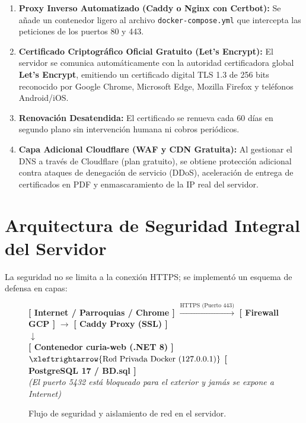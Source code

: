 \documentclass[11pt,a4paper]{article}
\begin{document}
\begin{enumerate}[leftmargin=1.2cm]
    \item \textbf{Proxy Inverso Automatizado (Caddy o Nginx con Certbot):} Se añade un contenedor ligero al archivo \texttt{docker-compose.yml} que intercepta las peticiones de los puertos 80 y 443.
    \item \textbf{Certificado Criptográfico Oficial Gratuito (Let's Encrypt):} El servidor se comunica automáticamente con la autoridad certificadora global \textbf{Let's Encrypt}, emitiendo un certificado digital TLS 1.3 de 256 bits reconocido por Google Chrome, Microsoft Edge, Mozilla Firefox y teléfonos Android/iOS.
    \item \textbf{Renovación Desatendida:} El certificado se renueva cada 60 días en segundo plano sin intervención humana ni cobros periódicos.
    \item \textbf{Capa Adicional Cloudflare (WAF y CDN Gratuita):} Al gestionar el DNS a través de Cloudflare (plan gratuito), se obtiene protección adicional contra ataques de denegación de servicio (DDoS), aceleración de entrega de certificados en PDF y enmascaramiento de la IP real del servidor.
\end{enumerate}

\section{Arquitectura de Seguridad Integral del Servidor}

La seguridad no se limita a la conexión HTTPS; se implementó un esquema de defensa en capas:

\begin{figure}[h!]
\centering
\small
\begin{tcolorbox}[colback=grisclaro,colframe=azulcuria,arc=1mm,width=\textwidth]
\centering
\textbf{[ Internet / Parroquias / Chrome ]} $\xrightarrow{\text{HTTPS (Puerto 443)}}$ \textbf{[ Firewall GCP ]} $\xrightarrow{}$ \textbf{[ Caddy Proxy (SSL) ]}\\
$\downarrow$\\
\textbf{[ Contenedor curia-web (.NET 8) ]} $\xleftrightarrow{\text{Red Privada Docker (127.0.0.1)}}$ \textbf{[ PostgreSQL 17 / BD.sql ]}\\
\textit{(El puerto 5432 está bloqueado para el exterior y jamás se expone a Internet)}
\end{tcolorbox}
\caption{Flujo de seguridad y aislamiento de red en el servidor.}
\end{figure}
\end{document}
